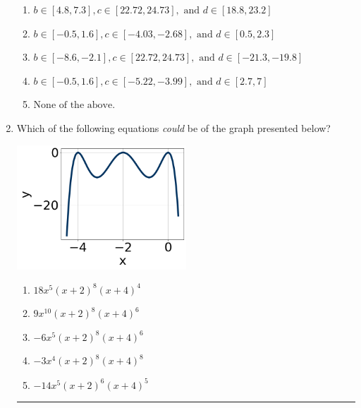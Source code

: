 \documentclass[14pt]{extbook}
\newcommand{\litem}[1]{\item#1\hspace*{-1cm}\rule{\textwidth}{0.4pt}}
\begin{document}
\begin{enumerate}
{\begin{enumerate}[label=\Alph*.]
\item \( b \in [4.8, 7.3], c \in [22.72, 24.73], \text{ and } d \in [18.8, 23.2] \)
\item \( b \in [-0.5, 1.6], c \in [-4.03, -2.68], \text{ and } d \in [0.5, 2.3] \)
\item \( b \in [-8.6, -2.1], c \in [22.72, 24.73], \text{ and } d \in [-21.3, -19.8] \)
\item \( b \in [-0.5, 1.6], c \in [-5.22, -3.99], \text{ and } d \in [2.7, 7] \)
\item \( \text{None of the above.} \)

\end{enumerate} }
\litem{
Which of the following equations \textit{could} be of the graph presented below?
\begin{center}
    \includegraphics[width=0.5\textwidth]{../Figures/polyGraphToFunctionCopyC.png}
\end{center}
\begin{enumerate}[label=\Alph*.]
\item \( 18x^{5} (x + 2)^{8} (x + 4)^{4} \)
\item \( 9x^{10} (x + 2)^{8} (x + 4)^{6} \)
\item \( -6x^{5} (x + 2)^{8} (x + 4)^{6} \)
\item \( -3x^{4} (x + 2)^{8} (x + 4)^{8} \)
\item \( -14x^{5} (x + 2)^{6} (x + 4)^{5} \)


\end{enumerate}}
\end{enumerate}
\end{document}
